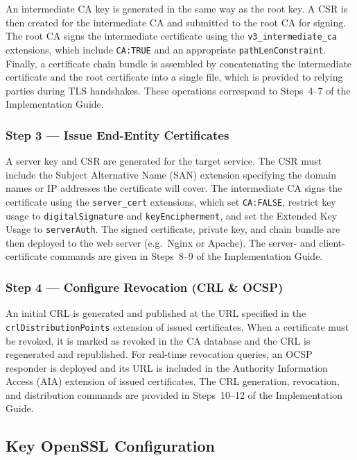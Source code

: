 \documentclass[10pt,twocolumn]{article}
\newcommand{\IGbase}{https://github.com/willLeckyThom/NetworkSecurity/blob/main/Projet/certificate_chain.md}
\newif\ifIGhref
\newcommand{\IGstep}[2]{\ifIGhref\href{\IGbase\##1}{#2}\else#2\fi}%
\begin{document}
An intermediate CA key is generated in the same way as the root key. A CSR
is then created for the intermediate CA and submitted to the root CA for
signing. The root CA signs the intermediate certificate using the
\texttt{v3\_intermediate\_ca} extensions, which include
\texttt{CA:TRUE} and an appropriate \texttt{pathLenConstraint}. Finally,
a certificate chain bundle is assembled by concatenating the intermediate
certificate and the root certificate into a single file, which is provided
to relying parties during TLS handshakes. These operations correspond to
\IGstep{step-4-configure-the-intermediate-ca}{Steps~4--7 of the Implementation
Guide}.

\subsubsection{Step 3 --- Issue End-Entity Certificates}

A server key and CSR are generated for the target service. The CSR must
include the Subject Alternative Name (SAN) extension specifying the domain
names or IP addresses the certificate will cover. The intermediate CA signs
the certificate using the \texttt{server\_cert} extensions, which set
\texttt{CA:FALSE}, restrict key usage to \texttt{digitalSignature} and
\texttt{keyEncipherment}, and set the Extended Key Usage to
\texttt{serverAuth}. The signed certificate, private key, and chain bundle
are then deployed to the web server (e.g.\ Nginx or Apache). The server- and
client-certificate commands are given in
\IGstep{step-8-issue-a-server-certificate}{Steps~8--9 of the Implementation
Guide}.

\subsubsection{Step 4 --- Configure Revocation (CRL \& OCSP)}

An initial CRL is generated and published at the URL specified in the
\texttt{crlDistributionPoints} extension of issued certificates. When a
certificate must be revoked, it is marked as revoked in the CA database and
the CRL is regenerated and republished. For real-time revocation queries, an
OCSP responder is deployed and its URL is included in the
Authority Information Access (AIA) extension of issued certificates. The CRL
generation, revocation, and distribution commands are provided in
\IGstep{step-10-generate-the-initial-crl}{Steps~10--12 of the Implementation
Guide}.

\subsection{Key OpenSSL Configuration}
\end{document}
